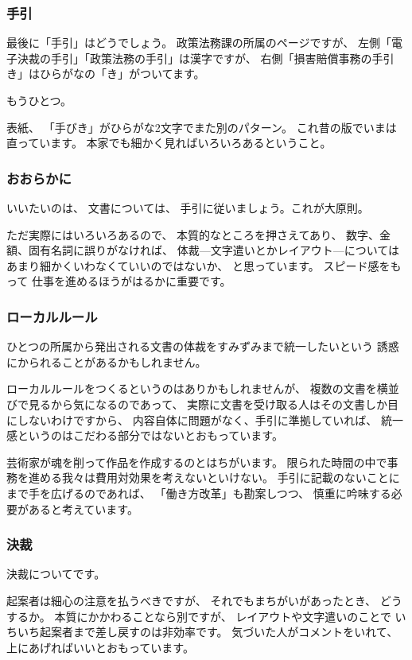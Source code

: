 \documentclass[uplatex,jis2004,dvipdfmx,12pt]{jsarticle}
\begin{document}
\subsubsection{手引}
最後に「手引」はどうでしょう。
政策法務課の所属のページですが、
左側「電子決裁の手引」「政策法務の手引」は漢字ですが、
右側「損害賠償事務の手引き」はひらがなの「き」がついてます。


もうひとつ。

表紙、
「手びき」がひらがな2文字でまた別のパターン。
これ昔の版でいまは直っています。
本家でも細かく見ればいろいろあるということ。


\subsubsection{おおらかに}
いいたいのは、
文書については、
手引に従いましょう。これが大原則。

ただ実際にはいろいろあるので、
本質的なところを押さえてあり、
数字、金額、固有名詞に誤りがなければ、
体裁---文字遣いとかレイアウト---については
あまり細かくいわなくていいのではないか、
と思っています。
スピード感をもって
仕事を進めるほうがはるかに重要です。


\subsubsection{ローカルルール}

ひとつの所属から発出される文書の体裁をすみずみまで統一したいという
誘惑にかられることがあるかもしれません。

ローカルルールをつくるというのはありかもしれませんが、
複数の文書を横並びで見るから気になるのであって、
実際に文書を受け取る人はその文書しか目にしないわけですから、
内容自体に問題がなく、手引に準拠していれば、
統一感というのはこだわる部分ではないとおもっています。

芸術家が魂を削って作品を作成するのとはちがいます。
限られた時間の中で事務を進める我々は費用対効果を考えないといけない。
手引に記載のないことにまで手を広げるのであれば、
「働き方改革」も勘案しつつ、
慎重に吟味する必要があると考えています。




\subsubsection{決裁}

決裁についてです。

起案者は細心の注意を払うべきですが、
それでもまちがいがあったとき、
どうするか。
本質にかかわることなら別ですが、
レイアウトや文字遣いのことで
いちいち起案者まで差し戻すのは非効率です。
気づいた人がコメントをいれて、
上にあげればいいとおもっています。
\end{document}
